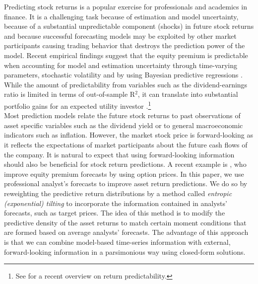 %
\indent Predicting stock returns is a popular exercise for professionals and academics in finance. It is a challenging task because of estimation and model uncertainty, because of a substantial unpredictable component (shocks) in future stock returns and because successful forecasting models may be exploited by other market participants causing trading behavior that destroys the prediction power of the model. Recent empirical findings suggest that the equity premium is predictable when accounting for model and estimation uncertainty through time-varying parameters, stochastic volatility and by using Bayesian predictive regressions \citep{zellner1965,barberis2000,pettenuzzo2016}. While the amount of predictability from variables such as the dividend-earnings ratio is limited in terms of out-of-sample R$^2$, it can translate into substantial portfolio gains for an expected utility investor \citep{johannes2014}.\footnote{See \cite{rapach2013} for a recent overview on return predictability.}\\
%
\indent Most prediction models relate the future stock returns to past observations of asset specific variables such as the dividend yield or to general macroeconomic indicators such as inflation. However, the market stock price is forward-looking as it reflects the expectations of market participants about the future cash flows of the company. It is natural to expect that using forward-looking information should also be beneficial for stock return predictions. A recent example is \cite{metaxoglou2016}, who improve equity premium forecasts by using option prices. In this paper, we use professional analyst's forecasts to improve asset return predictions. We do so by reweighting the predictive return distributions by a method called \textit{entropic (exponential) tilting} to incorporate the information contained in analysts' forecasts, such as target prices. The idea of this method is to modify the predictive density of the asset returns to match certain moment conditions that are formed based on average analysts' forecasts. The advantage of this approach is that we can combine model-based time-series information with external, forward-looking information in a parsimonious way using closed-form solutions.\\
